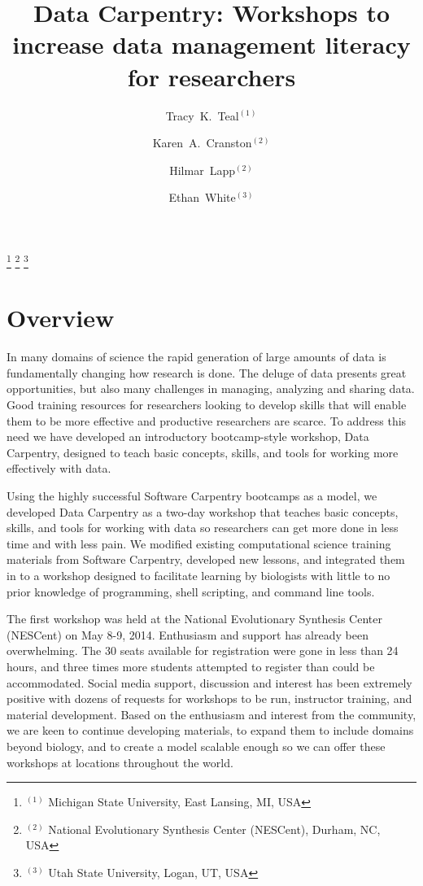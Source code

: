 \documentclass[11pt]{article}
\begin{document}
\title{Data Carpentry: Workshops to increase data management literacy for researchers}
\author{Tracy~K.~Teal$^{(1)}$ \and Karen~A.~Cranston$^{(2)}$ \and Hilmar~Lapp$^{(2)}$ \and Ethan~White$^{(3)}$}
\thanks{{}$^{(1)}$ Michigan State University, East Lansing, MI, USA}
\thanks{{}$^{(2)}$ National Evolutionary Synthesis Center (NESCent), Durham, NC, USA}
\thanks{{}$^{(3)}$ Utah State University, Logan, UT, USA}
\date{}

\maketitle

\section{Overview }
In many domains of science the rapid generation of
large amounts of data is fundamentally changing how
research is done. The deluge of data presents great
opportunities, but also many challenges in managing, analyzing and
sharing data. Good training resources for researchers looking
to develop skills that will enable them to be more effective and
productive researchers are scarce. To address this need we have
developed an introductory bootcamp-style workshop, Data Carpentry,
designed to teach basic concepts, skills, and tools for working more
effectively with data.

Using the highly successful Software Carpentry bootcamps as a model,
we developed Data Carpentry as a two-day workshop that teaches basic
concepts, skills, and tools for working with data so researchers can
get more done in less time and with less pain. We modified existing
computational science training materials from Software Carpentry,
developed new lessons, and integrated them in to a workshop designed to
facilitate learning by biologists with little to no prior knowledge of
programming, shell scripting, and command line tools.

The first workshop was held at the National Evolutionary Synthesis
Center (NESCent) on May 8-9, 2014.
Enthusiasm and support has already been overwhelming. The 30 seats
available for registration were gone in less than 24 hours, and
three times more students attempted to register than could be accommodated. Social media
support, discussion and interest has been extremely positive with
dozens of requests for workshops to be run, instructor
training, and material development. Based on the enthusiasm and
interest from the community, we are keen to continue developing
materials, to expand them to include domains beyond biology, and to
create a model scalable enough so we can offer these workshops at
locations throughout the world.
\end{document}
